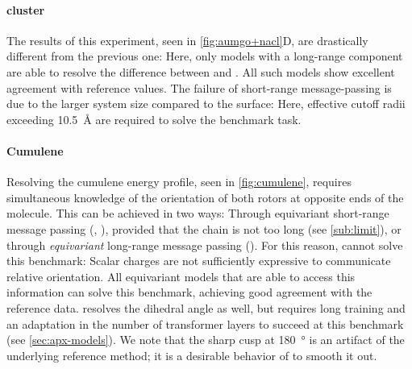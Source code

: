 \documentclass[10pt]{article}
\begin{document}
\paragraph{ cluster}
The results of this experiment, seen in \cref{fig:aumgo+nacl}D, are drastically different from the previous one: Here, only models with a long-range component are able to resolve the difference between  and . All such models show excellent agreement with reference values. The failure of short-range message-passing is due to the larger system size compared to the  surface: Here, effective cutoff radii exceeding \qty{10.5}{\angstrom} are required to solve the benchmark task.



\paragraph{Cumulene} Resolving the cumulene energy profile, seen in \cref{fig:cumulene}, requires simultaneous knowledge of the orientation of both rotors at opposite ends of the molecule. This can be achieved in two ways: Through equivariant short-range message passing (\mace, \pet), provided that the chain is not too long (see \cref{sub:limit}), or through \emph{equivariant} long-range message passing (\lorem). For this reason,  \cace cannot solve this benchmark: Scalar charges are not sufficiently expressive to communicate relative orientation.
All equivariant models that are able to access this information can solve this benchmark, achieving good agreement with the reference data. 
\pet resolves the dihedral angle as well, but requires long training and an adaptation in the number of transformer layers to succeed at this benchmark (see \cref{sec:apx-models}). 
We note that the sharp cusp at \qty{180}{\degree} is an artifact of the underlying reference method; it is a desirable behavior of \mlps to smooth it out.
\end{document}
